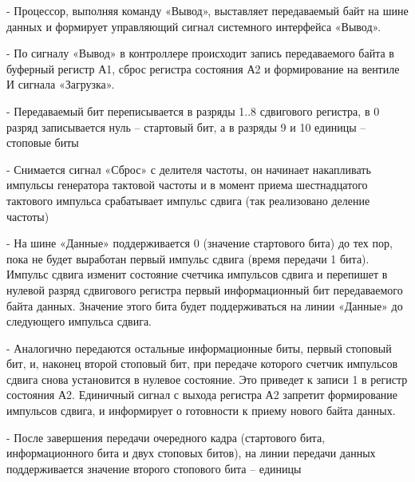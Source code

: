 \documentclass{article}
\begin{document}
-	Процессор, выполняя команду «Вывод», выставляет передаваемый байт на шине данных и формирует управляющий сигнал системного интерфейса «Вывод».

-	По сигналу «Вывод» в контроллере происходит запись передаваемого байта в буферный регистр А1, сброс регистра состояния А2 и формирование на вентиле И сигнала «Загрузка».

-	Передаваемый бит переписывается в разряды 1..8 сдвигового регистра, в 0 разряд записывается нуль – стартовый бит, а в разряды 9 и 10 единицы – стоповые биты

-	Снимается сигнал «Сброс» с делителя частоты, он начинает накапливать импульсы генератора тактовой частоты и в момент приема шестнадцатого тактового импульса срабатывает импульс сдвига (так реализовано деление частоты)

-	На шине «Данные» поддерживается 0 (значение стартового бита) до тех пор, пока не будет выработан первый импульс сдвига (время передачи 1 бита). Импульс сдвига изменит состояние счетчика импульсов сдвига и перепишет в нулевой разряд сдвигового регистра первый информационный бит передаваемого байта данных. Значение этого бита будет поддерживаться на линии «Данные» до следующего импульса сдвига.

-	Аналогично передаются остальные информационные биты, первый стоповый бит, и, наконец второй стоповый бит, при передаче которого счетчик импульсов сдвига снова установится в нулевое состояние. Это приведет к записи 1 в регистр состояния А2. Единичный сигнал с выхода регистра А2 запретит формирование импульсов сдвига, и информирует о готовности к приему нового байта данных.

-	После завершения передачи очередного кадра (стартового бита, информационного бита и двух стоповых битов), на линии передачи данных поддерживается значение второго стопового бита – единицы
\end{document}
